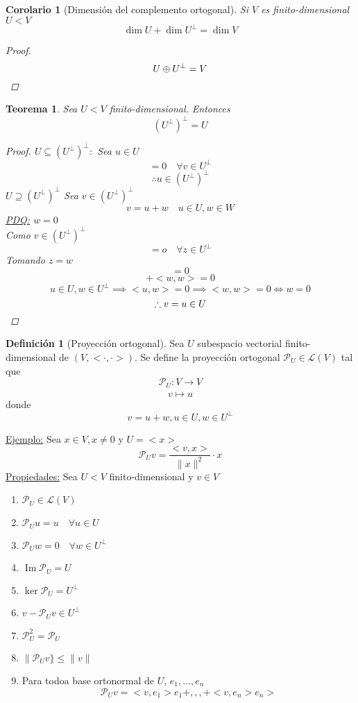 \documentclass[11pt]{book}
\newcommand{\func}[5]{#1:#2\xrightarrow[#5]{#4}#3}
\DeclareMathOperator{\Ima}{Im}
\newtheorem{thm}{Teorema}[section]
\newtheorem*{cor}{Corolario}
\theoremstyle{definition}
\newtheorem{defn}{Definición}[section]
\begin{document}
\begin{cor}[Dimensión del complemento ortogonal]
	Si $V$ es finito-dimensional $U<V$
	\[\dim U+\dim U^\perp=\dim V\]
	\begin{proof}
		\[U\oplus U^\perp=V\qedhere\]
	\end{proof}
\end{cor}
\begin{thm}
	Sea $U<V$ finito-dimensional. Entonces
	\[(U^\perp)^\perp=U\]
	\begin{proof}
		\underline{$U\subseteq(U^\perp)^\perp:$} Sea $u\in U$
		\[<v,u>=0\quad\forall v\in U^\perp\]
		\[\therefore u\in (U^\perp)^\perp\]
		\underline{$U\supseteq(U^\perp)^\perp$} Sea $v\in (U^\perp)^\perp$
		\[v=u+w\quad u\in U,w\in W\]
		\underline{PDQ:} $w=0$\\
		Como $v\in (U^\perp)^\perp$
		\[<v,z>=o\quad\forall z\in U^\perp\]
		Tomando $z=w$
		\[<u+w,w>=0\]
		\[<u,w>+<w,w>=0\]
		\[u\in U, w\in U^\perp\implies <u,w>=0\implies <w,w>=0\iff w=0\]
		\[\therefore v=u\in U\qedhere\]
	\end{proof}
\end{thm}
\begin{defn}[Proyección ortogonal]
	Sea $U$ subespacio vectorial finito-dimensional de $(V,<\cdot,\cdot>)$. Se define la proyección ortogonal $\mathcal{P}_U\in\mathcal{L}(V)$ tal que
	\[\func{\mathcal{P}_U}{V}{V}{}{}\]
	\[v\mapsto u\]
	donde
	\[v=u+w, u\in U, w\in U^\perp\]
\end{defn}
\underline{Ejemplo:} Sea $x\in V,x\neq 0$ y $U=<x>$
\[\mathcal{P}_Uv=\frac{<v,x>}{\|x\|^2}\cdot x\]
\underline{Propiedades:} Sea $U<V$ finito-dimensional y $v\in V$
\begin{enumerate}[label=\textbf{(\alph*)}]
	\item $\mathcal{P}_U\in\mathcal{L}(V)$

	\item $\mathcal{P}_Uu=u\quad\forall u\in U$

	\item $\mathcal{P}_Uw=0\quad\forall w\in U^\perp$

	\item $\Ima\mathcal{P}_U=U$

	\item $\ker\mathcal{P}_U=U^\perp$

	\item $v-\mathcal{P}_Uv\in U^\perp$

	\item $\mathcal{P}_U^2=\mathcal{P}_U$

	\item $\|\mathcal{P}_Uv\}\leq\|v\|$

	\item Para todoa base ortonormal de $U$, $e_1,...,e_n$
	\[\mathcal{P}_Uv=<v,e_1>e_1+,,,+<v,e_n>e_n>\] 
\end{enumerate}
\end{document}
